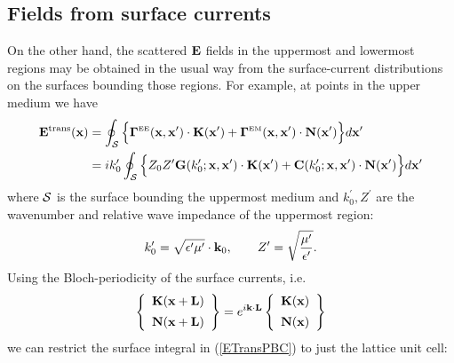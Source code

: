 \documentclass[letterpaper]{article}
\begin{document}
\subsection*{Fields from surface currents}

On the other hand, the scattered $\mathbf{E}$ fields in the uppermost
and lowermost regions may be obtained in the usual way from the
surface-current distributions on the surfaces bounding those
regions. For example, at points in the upper medium we have 
\begin{align}
 \mathbf{E}^{\hbox{\scriptsize{trans}}}(\mathbf{x})
&=\oint_{\mathcal{S}} \Big\{ 
   \boldsymbol{\Gamma}^{\hbox{\tiny{EE}}}(\mathbf{x},\mathbf{x}^\prime)\cdot \mathbf{K}(\mathbf{x}^\prime)
  +\boldsymbol{\Gamma}^{\hbox{\tiny{EM}}}(\mathbf{x},\mathbf{x}^\prime)\cdot \mathbf{N}(\mathbf{x}^\prime)
                \Big\}d\mathbf{x}^\prime
\nonumber \\
&=ik_0^\prime \oint_{\mathcal{S}} \Big\{ 
   Z_0 Z^\prime \mathbf{G}(k_0^\prime; \mathbf{x},\mathbf{x}^\prime)
                    \cdot \mathbf{K}(\mathbf{x}^\prime)
               +\mathbf{C}(k_0^\prime; \mathbf{x},\mathbf{x}^\prime)
                    \cdot \mathbf{N}(\mathbf{x}^\prime) \Big\}d\mathbf{x}^\prime
\label{ETransPBC}
\end{align}
where $\mathcal{S}$ is the surface bounding the uppermost medium and
$k_0^\prime, Z^\prime$ are the wavenumber and relative wave 
impedance of the uppermost region:
$$k_0^\prime=\sqrt{\epsilon^\prime \mu^\prime }\cdot \mathbf{k}_0,
  \qquad
  Z^\prime=\sqrt{\frac{\mu^\prime}{\epsilon^\prime}}.
$$
Using the Bloch-periodicity of the surface currents, i.e.
$$ \left\{ \begin{array}{c} 
   \mathbf{K}(\mathbf{x}+\mathbf{L}) \\[5pt] \mathbf{N}(\mathbf{x}+\mathbf{L})
   \end{array}\right\}
   =
   e^{i\mathbf{k} \cdot \mathbf{L}}
   \left\{ \begin{array}{c} 
   \mathbf{K}(\mathbf{x}) \\[5pt] \mathbf{N}(\mathbf{x})
   \end{array}\right\}
$$
we can restrict the surface integral in (\ref{ETransPBC}) to 
just the lattice unit cell:
\end{document}
